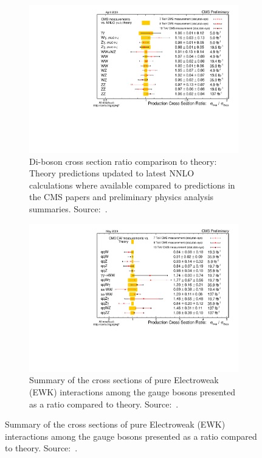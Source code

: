 \begin{figure}[htbp]
  \centering
  \begin{subfigure}[htbp]{0.48\textwidth}
    \centering
    \includegraphics[width=\textwidth]{figures_and_tables/theory/sm_vbf_results.pdf}
    \caption{ Di-boson cross section ratio comparison to theory: Theory predictions updated to latest NNLO calculations where available compared to predictions in the CMS papers and preliminary physics analysis summaries. Source:~\cite{cms_sm_xsec_summary}.}
    \label{sm_vbf_results}
  \end{subfigure}
  \hfill
  \begin{subfigure}[htbp]{0.48\textwidth}
    \centering
    \includegraphics[width=\textwidth]{figures_and_tables/theory/sm_ewk_results.pdf}
    \caption{ Summary of the cross sections of pure Electroweak (EWK) interactions among the gauge bosons presented as a ratio compared to theory. Source:~\cite{cms_sm_xsec_summary}.}
    \label{sm_ewk_results}
  \end{subfigure}
\end{figure}

